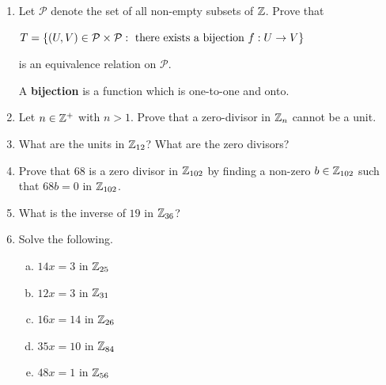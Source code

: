 \documentclass[11pt,fleqn,dvipsnames,usenames]{article}
\begin{document}
\begin{enumerate}
\item Let $\mathcal{P}$ denote the set of all non-empty subsets of $\mathbb{Z}$.  Prove that
\begin{center}
$T = \left\{(U,V)\in \mathcal{P}\times\mathcal{P}:\text{ there exists a bijection }f:U\to V\right\}$
\end{center}
is an equivalence relation on $\mathcal{P}$.
\vsmsp

\recall A \textbf{bijection} is a function which is one-to-one and onto.


\item Let $n\in\mathbb{Z}^+$ with $n > 1$.  Prove that a zero-divisor in $\mathbb{Z}_n$ cannot be a unit.
\item What are the units in $\mathbb{Z}_{12}$?  What are the zero divisors?
\item Prove that $68$ is a zero divisor in $\mathbb{Z}_{102}$ by finding a non-zero $b\in\mathbb{Z}_{102}$ such that $68b = 0$ in $\mathbb{Z}_{102}$.
\item What is the inverse of $19$ in $\mathbb{Z}_{36}$?
\item Solve the following.
\begin{enumerate}[(a)]
\item $14x = 3$ in $\mathbb{Z}_{25}$
\item $12x = 3$ in $\mathbb{Z}_{31}$
\item $16x = 14$ in $\mathbb{Z}_{26}$
\item $35x = 10$ in $\mathbb{Z}_{84}$
\item $48x = 1$ in $\mathbb{Z}_{56}$
\end{enumerate}
\end{enumerate}
\end{document}
